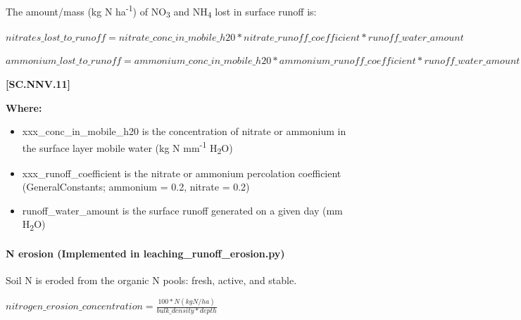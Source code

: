 The amount/mass (kg N ha\textsuperscript{-1}) of NO\textsubscript{3} and NH\textsubscript{4} lost in surface runoff  is: 
\vspace{0.5cm}
            
    \begin{center}

 \(nitrates\_lost\_to\_runoff=nitrate\_conc\_in\_mobile\_h20 * nitrate\_runoff\_coefficient * runoff\_water\_amount\)
\vspace{0.1cm}

 \(ammonium\_lost\_to\_runoff=ammonium\_conc\_in\_mobile\_h20 * ammonium\_runoff\_coefficient * runoff\_water\_amount\)

    \end{center}
        \vspace{0.5cm} 
    
            {\raggedleft \textbf{[SC.NNV.11]}\par}
            \vspace{0.5cm}

        \textbf{Where:}
            
        \begin{itemize}
            \item xxx\_conc\_in\_mobile\_h20 is the concentration of nitrate or ammonium in the surface layer mobile water (kg N mm\textsuperscript{-1} H\textsubscript{2}O)
            \item xxx\_runoff\_coefficient is the nitrate or ammonium percolation coefficient (GeneralConstants; ammonium = 0.2, nitrate = 0.2)
            \item runoff\_water\_amount is the surface runoff generated on a given day (mm H\textsubscript{2}O) 
        \end{itemize}
    \vspace{0.5cm}

\paragraph{N erosion (Implemented in leaching\_runoff\_erosion.py)}

Soil N is eroded from the organic N pools: fresh, active, and stable.
\vspace{0.5cm}
            
    \begin{center}

 \(nitrogen\_erosion\_concentration= \frac{100 * N(kg N/ha)}{bulk\_density * depth}\)

    \end{center}
        \vspace{0.5cm} 
    
